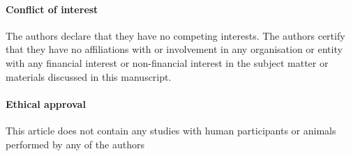 \documentclass[pdftex,twocolumn,epjc3]{svjour3}
\begin{document}
\paragraph{Conflict of interest} The authors declare that they have no competing interests. The authors certify that they have no affiliations with or involvement in any organisation or entity with any financial interest or non-financial interest in the subject matter or materials discussed in this manuscript.

\paragraph{Ethical approval} This article does not contain any studies with human participants or animals performed by any of the authors


\appendix
\end{document}
